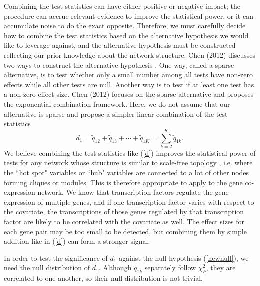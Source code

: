 \documentclass[12pt]{article}
\theoremstyle{theorem}
\begin{document}
\noindent
Combining the test statistics can have either positive or negative impact; the procedure can accrue relevant evidence to improve the statistical power, or it can accumulate noise to do the exact opposite. Therefore, we must carefully decide how to combine the test statistics based on the alternative hypothesis we would like to leverage against, and the alternative hypothesis must be constructed reflecting our prior knowledge about the network structure. Chen (2012) discusses two ways to construct the alternative hypothesis \cite{chen2012exponential}. One way, called a sparse alternative, is to test whether only a small number among all tests have non-zero effects while all other tests are null. Another way is to test if at least one test has a non-zero effect size. Chen (2012) focuses on the sparse alternative and proposes the exponential-combination framework. Here, we do not assume that our alternative is sparse and propose a simpler linear combination of the test statistics
\begin{equation}
d_1 = \tilde{q}_{12} + \tilde{q}_{13} + \cdots + \tilde{q}_{1K} = \sum_{k=2}^{K} \tilde{q}_{1k}.
\label{d}
\end{equation}
We believe combining the test statistics like (\ref{d}) improves the statistical power of tests for any network whose structure is similar to scale-free topology \cite{horvath2008geometric}, i.e. where the ``hot spot" variables or ``hub" variables are connected to a lot of other nodes forming cliques or modules. This is therefore appropriate to apply to the gene co-expression network. We know that transcription factors regulate the gene expression of multiple genes, and if one transcription factor varies with respect to the covariate, the transcriptions of those genes regulated by that transcription factor are likely to be correlated with the covariate as well. The effect sizes for each gene pair may be too small to be detected, but combining them by simple addition like in (\ref{d}) can form a stronger signal.

\vspace{5mm} \noindent
In order to test the significance of $d_1$ against the null hypothesis (\ref{newnull}), we need the null distribution of $d_1$. Although $\tilde{q}_{1k}$ separately follow $\chi_{P}^2$, they are correlated to one another, so their null distribution is not trivial. \\
\end{document}
